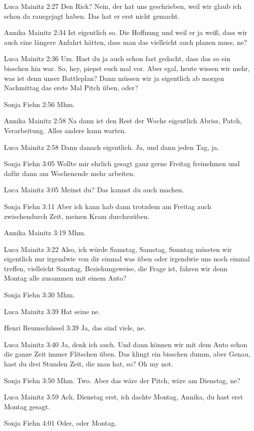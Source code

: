 Luca Mainitz   2:27
Den Rick? Nein, der hat uns geschrieben, weil wir glaub ich schon da rausgejagt haben. Das hat er erst nicht gemacht.

Annika Mainitz   2:34
Ist eigentlich so.
Die Hoffnung und weil er ja weiß, dass wir auch eine längere Anfahrt hätten, dass man das vielleicht auch planen muss, ne?

Luca Mainitz   2:36
Um.
Hast du ja auch schon fast gedacht, dass das so ein bisschen hin war. So, hey, piepst euch mal vor.
Aber egal, heute wissen wir mehr, was ist denn unser Battleplan? Dann müssen wir ja eigentlich ab morgen Nachmittag das erste Mal Pitch üben, oder?

Sonja Fiehn   2:56
Mhm.

Annika Mainitz   2:58
Na dann ist den Rest der Woche eigentlich Abriss, Patch, Verarbeitung. Alles andere kann warten.

Luca Mainitz   2:58
Dann danach eigentlich.
Ja, und dann jeden Tag, ja.

Sonja Fiehn   3:05
Wollte mir ehrlich gesagt ganz gerne Freitag freinehmen und dafür dann am Wochenende mehr arbeiten.

Luca Mainitz   3:05
Meinst du?
Das kannst du auch machen.

Sonja Fiehn   3:11
Aber ich kann hab dann trotzdem am Freitag auch zwischendurch Zeit, meinen Kram durchzuüben.

Annika Mainitz   3:19
Mhm.

Luca Mainitz   3:22
Also, ich würde Samstag, Samstag, Sonntag müssten wir eigentlich nur irgendwie von dir einmal was üben oder irgendwie uns noch einmal treffen, vielleicht Sonntag. Beziehungsweise, die Frage ist, fahren wir denn Montag alle zusammen mit einem Auto?

Sonja Fiehn   3:30
Mhm.

Luca Mainitz   3:39
Hat seine ne.

Henri Reumschüssel   3:39
Ja, das sind viele, ne.

Luca Mainitz   3:40
Ja, denk ich auch. Und dann können wir mit dem Auto schon die ganze Zeit immer Flitschen üben. Das klingt ein bisschen dumm, aber
Genau, hast du drei Stunden Zeit, die man hat, so? Oh my not.

Sonja Fiehn   3:50
Mhm.
Two.
Aber das wäre der Pitch, wäre am Dienstag, ne?

Luca Mainitz   3:59
Ach, Dienstag erst, ich dachte Montag, Annika, du hast erst Montag gesagt.

Sonja Fiehn   4:01
Oder, oder Montag.

